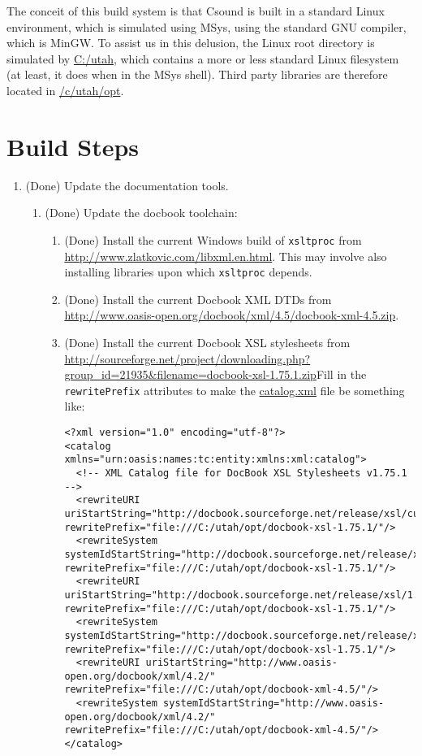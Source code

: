 \documentclass[11pt,letterpaper,onecolumn]{scrartcl}
\begin{document}
\begin{sloppypar}
The conceit of this build system is that Csound is built in a standard Linux environment, which is simulated using MSys, using the standard GNU compiler, which is MinGW. To assist us in this delusion, the Linux root directory is simulated by \url{C:/utah}, which contains a more or less standard Linux filesystem (at least, it does when in the MSys shell). Third party libraries are therefore located in \url{/c/utah/opt}.

\section{Build Steps}
\label{sec:BuildSteps}

\begin{enumerate}
	\item (Done) Update the documentation tools.
		\begin{enumerate}
	    \item (Done) Update the docbook toolchain:
				\begin{enumerate}
					\item (Done) Install the current Windows build of \texttt{xsltproc} from \url{http://www.zlatkovic.com/libxml.en.html}. This may involve also installing libraries upon which \texttt{xsltproc} depends.
					\item (Done) Install the current Docbook XML DTDs from \url{http://www.oasis-open.org/docbook/xml/4.5/docbook-xml-4.5.zip}.
					\item (Done) Install the current Docbook XSL stylesheets from \url{http://sourceforge.net/project/downloading.php?group_id=21935&filename=docbook-xsl-1.75.1.zip}Fill in the \texttt{rewritePrefix} attributes to make the \url{catalog.xml} file be something like:
					\begin{lstlisting}
<?xml version="1.0" encoding="utf-8"?>
<catalog xmlns="urn:oasis:names:tc:entity:xmlns:xml:catalog">
  <!-- XML Catalog file for DocBook XSL Stylesheets v1.75.1 -->
  <rewriteURI uriStartString="http://docbook.sourceforge.net/release/xsl/current/" rewritePrefix="file:///C:/utah/opt/docbook-xsl-1.75.1/"/>
  <rewriteSystem systemIdStartString="http://docbook.sourceforge.net/release/xsl/current/" rewritePrefix="file:///C:/utah/opt/docbook-xsl-1.75.1/"/>
  <rewriteURI uriStartString="http://docbook.sourceforge.net/release/xsl/1.75.1/" rewritePrefix="file:///C:/utah/opt/docbook-xsl-1.75.1/"/>
  <rewriteSystem systemIdStartString="http://docbook.sourceforge.net/release/xsl/1.75.1/" rewritePrefix="file:///C:/utah/opt/docbook-xsl-1.75.1/"/>
  <rewriteURI uriStartString="http://www.oasis-open.org/docbook/xml/4.2/" rewritePrefix="file:///C:/utah/opt/docbook-xml-4.5/"/>
  <rewriteSystem systemIdStartString="http://www.oasis-open.org/docbook/xml/4.2/" rewritePrefix="file:///C:/utah/opt/docbook-xml-4.5/"/>
</catalog>
					\end{lstlisting}
				\end{enumerate}


\end{enumerate}
\end{enumerate}
\end{sloppypar}
\end{document}
